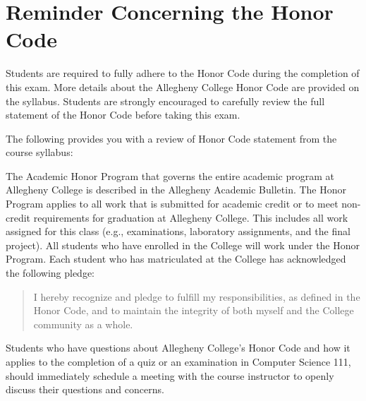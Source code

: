 \vspace*{-.15in}
\section*{Reminder Concerning the Honor Code}

\noindent Students are required to fully adhere to the Honor Code during the completion of this exam. More details about
the Allegheny College Honor Code are provided on the syllabus. Students are strongly encouraged to carefully review the
full statement of the Honor Code before taking this exam.

\noindent The following provides you with a review of Honor Code statement from the course syllabus:

The Academic Honor Program that governs the entire academic program at Allegheny College is described in the Allegheny
Academic Bulletin.  The Honor Program applies to all work that is submitted for academic credit or to meet non-credit
requirements for graduation at Allegheny College.  This includes all work assigned for this class (e.g., examinations,
laboratory assignments, and the final project).  All students who have enrolled in the College will work under the Honor
Program.  Each student who has matriculated at the College has acknowledged the following pledge:

\vspace*{-.11in}
\begin{quote}
  I hereby recognize and pledge to fulfill my responsibilities, as defined in the Honor Code, and to maintain the
  integrity of both myself and the College community as a whole.
\end{quote}
\vspace*{-.11in}

\noindent Students who have questions about Allegheny College's Honor Code and how it applies to the completion of a
quiz or an examination in Computer Science 111, should immediately schedule a meeting with the course instructor to
openly discuss their questions and concerns.


